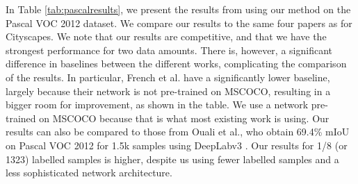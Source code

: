 \documentclass[10pt,twocolumn,letterpaper]{article}
\begin{document}
\vspace{0.4cm}
In Table \ref{tab:pascalresults}, we present the results from using our method on the Pascal VOC 2012 dataset. We compare our results to the same four papers as for Cityscapes. We note that our results are competitive, and that we have the strongest performance for two data amounts. There is, however, a significant difference in baselines between the different works, complicating the comparison of the results. In particular, French et al. have a significantly lower baseline, largely because their network is not pre-trained on MSCOCO, resulting in a bigger room for improvement, as shown in the table. We use a network pre-trained on MSCOCO because that is what most existing work is using. Our results can also be compared to those from Ouali et al., who obtain 69.4\% mIoU on Pascal VOC 2012 for 1.5k samples using DeepLabv3 \cite{ouali2020semisupervised}. Our results for 1/8 (or 1323) labelled samples is higher, despite us using fewer labelled samples and a less sophisticated network architecture.
\end{document}
